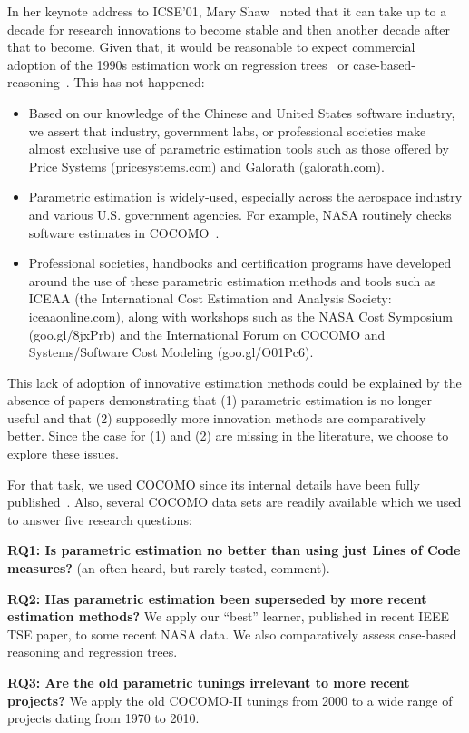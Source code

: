 \documentclass{sig-alternate}
\newcommand{\bi}{\begin{itemize}[leftmargin=0.4cm]}
\newcommand{\ei}{\end{itemize}}
\begin{document}
In her keynote address to ICSE'01, Mary Shaw~\cite{shaw01} noted that it can take up to a
decade  for  research innovations
to become stable and then another decade after that to become. Given that, it would be reasonable
to expect commercial adoption of  the 1990s estimation work
on  regression trees~\cite{shepperd97} or case-based-reasoning~\cite{shepperd97}.
This has not happened:
\bi
\item
Based on our knowledge of the Chinese and United States software industry,
we assert that  industry, government labs, or professional societies
make almost exclusive
use  of parametric estimation tools such as those offered by 
Price Systems (pricesystems.com) and  Galorath (galorath.com).
\item
Parametric estimation is
widely-used, especially across the aerospace
industry and various U.S. government agencies. For example,
NASA routinely checks  software estimates 
in  COCOMO~\cite{dabney07}.  
\item
Professional societies, handbooks and
certification programs have developed around the use
of these parametric estimation methods and tools such as ICEAA
(the
International Cost Estimation and Analysis Society: 
iceaaonline.com), along with workshops such as the
NASA Cost Symposium (goo.gl/8jxPrb) and the
International Forum on COCOMO and Systems/Software
Cost Modeling (goo.gl/O01Pc6).
\ei
This  lack of adoption of   innovative  estimation methods
could be explained by the absence of papers demonstrating that
(1) parametric estimation is no longer useful and that
(2) supposedly more innovation methods 
are comparatively better. 
Since the case for (1) and (2) are  missing in the literature,
we choose to  explore these  issues.

For that task,
we used COCOMO since its
internal details have been fully
published~\cite{boehm00b}. Also, several COCOMO data
sets are readily available
which we used to   answer five research questions:

{\bf RQ1: Is parametric estimation no better than
   using just Lines of Code measures?} 
  (an   often heard, but rarely tested, comment).

{\bf RQ2: Has parametric estimation been superseded
 by more recent estimation methods?}  We 
 apply our ``best''
learner, published in recent IEEE TSE paper, to some
recent NASA data. We also comparatively assess
case-based reasoning and regression trees.

{\bf RQ3: Are the old parametric tunings irrelevant
  to more recent projects?}  We apply the old
COCOMO-II tunings from 2000 to a wide range of projects dating from
1970 to 2010.
\end{document}
